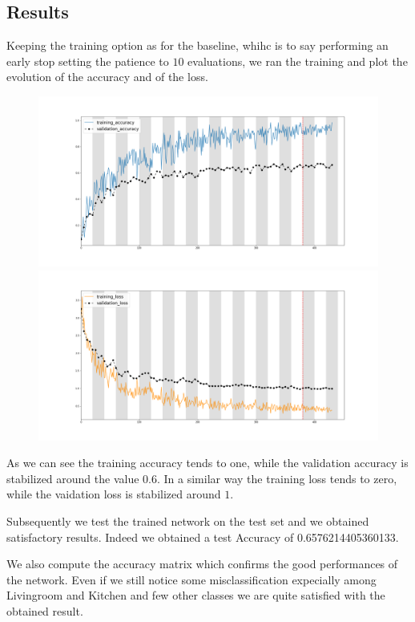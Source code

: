 \documentclass[12pt, a4paper]{report}
\begin{document}
\subsection*{Results}

Keeping the training option as for the baseline, whihc is to say performing an early stop setting the patience to $10$ evaluations, we ran the training and plot the evolution of the accuracy and of the loss.

\begin{figure}[h!]
	\centering
	{\includegraphics[width=.49\textwidth]{img/final_accuracy}}
	\label{fig:accuracy}
	{\includegraphics[width=.49\textwidth]{img/final_loss}}
	\label{fig:loss}
\end{figure}

As we can see the training accuracy tends to one, while the validation accuracy is stabilized around the value $0.6$. In a similar way the training loss tends to zero, while the vaidation loss is stabilized around $1$.

Subsequently we test the trained network on the test set and we obtained satisfactory results. Indeed we obtained a test Accuracy of 0.6576214405360133.

We also compute the accuracy matrix which confirms the good performances of the network. Even if we still notice some misclassification expecially among Livingroom and Kitchen and few other classes we are quite satisfied with the obtained result.
\end{document}
